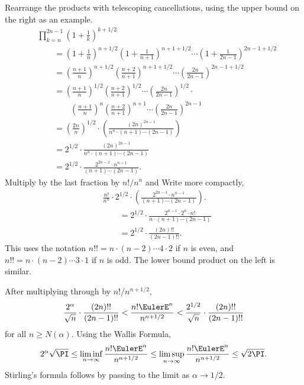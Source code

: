 \documentclass[12pt]{article}
\begin{document}
Rearrange the products with telescoping cancellations, using the upper
bound on the right as an example.
\begin{align*}
    & \prod_{k=n}^{2n-1} \left( 1 + \frac{1}{k} \right)^{k + 1/2} \\
    &\qquad = \left( 1 + \frac{1}{n} \right)^{n + 1/2} \left( 1 + \frac{1}
    {n+1} \right)^{n+1 + 1/2} \cdots \left( 1 + \frac{1}{2n-1} \right)^{2n-1
    + 1/2} \\
    &\qquad = \left(\frac{n+1}{n} \right)^{n + 1/2} \left(\frac{n+2}{n+1}
    \right)^{n+1 + 1/2} \cdots \left(\frac{2n}{2n-1} \right)^{2n-1 + 1/2}
    \\
    &\qquad = \left(\frac{n+1}{n} \right)^{1/2} \left(\frac{n+2}{n+1}
      \right)^{1/2} \cdots \left(\frac{2n}{2n-1} \right)^{1/2} \cdot \\
    & \qquad \qquad \left
    ( \frac{n+1}{n} \right)^{n} \left(\frac{n+2}{n+1} \right)^{n+1}
    \cdots \left(\frac{2n}{2n-1} \right)^{2n-1} \\
    &\qquad = \left( \frac{2n}{n} \right)^{1/2} \cdot \left( \frac{ (2n)^
    {2n-1}}{n^n \cdot (n+1) \cdots (2n-1)} \right) \\
    &\qquad = 2^{1/2} \cdot \frac{ (2n)^{2n-1}}{n^n \cdot (n+1) \cdots (2n-1)}
    \\
    &\qquad = 2^{1/2} \cdot \frac{ 2^{2n-1} \cdot n^{n-1}}{ (n+1) \cdots
    (2n-1)}.
\end{align*}
Multiply by the last fraction by \( n!/n^n \) and Write more compactly,
\begin{align*}
    & \frac{ n!}{ n^n } \cdot 2^{1/2} \cdot \left( \frac{ 2^{2n-1} \cdot
    n^{n-1}}{ (n+1) \cdots (2n-1)} \right).  \\
    & \qquad = 2^{1/2} \cdot \frac{ 2^{n-1} \cdot 2^n \cdot n!}{n \cdot
    (n+1) \cdots (2n-1) } \\
    & \qquad = 2^{1/2} \cdot \frac{(2n)!!}{(2n-1)!!}.
\end{align*}
This uses the  notation \( n!!  = n \cdot (n-2)
\cdots 4 \cdot 2 \) if \( n \) is even, and \( n!!  = n \cdot (n-2)
\cdots 3 \cdot 1 \) if \( n \) is odd.%
The lower bound product on the left is similar.

After multiplying through by \( n!/n^{n+1/2} \),
\[
    \frac{2^\alpha}{\sqrt{n}} \cdot \frac{ (2n)!!}{(2n-1)!!} < \frac{n!
    \EulerE^n}{n^{n+1/2}} < \frac{2^{1/2}}{\sqrt{n}} \cdot \frac{(2n)!!}
    {(2n-1)!!}
\] for all \( n \ge N(\alpha) \).  Using the Wallis Formula,%
\[
    2^\alpha \sqrt{\PI} \le \liminf_{n \to \infty} \frac{n!  \EulerE^n}{n^
    {n+1/2}} \le \limsup_{n \to \infty} \frac{n!  \EulerE^n}{n^{n+1/2}}
    \le \sqrt{2\PI}.
\] Stirling's formula follows by passing to the limit as \( \alpha \to
1/2 \).
\end{document}
